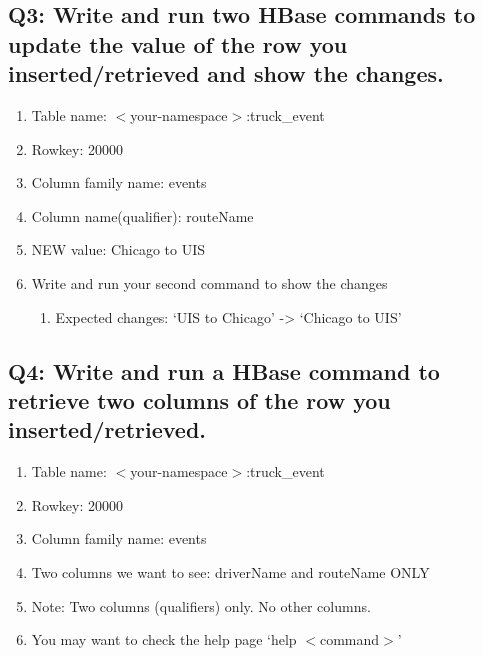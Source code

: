 \documentclass[]{article}
\begin{document}
\subsection*{Q3: Write and run two HBase commands to update the value of the row you inserted/retrieved and show the changes.} 
\begin{enumerate}[before=\itshape,font=\normalfont,label=\alph*.]
	\item Table name: $<$your-namespace$>$:truck\_event
	\item Rowkey: 20000
	\item Column family name: events
	\item Column name(qualifier): routeName
	\item NEW value: Chicago to UIS
	\item Write and run your second command to show the changes
	\begin{enumerate}[label=\roman*.]
		\item Expected changes: ‘UIS to Chicago’ -> ‘Chicago to UIS’
	\end{enumerate}
\end{enumerate}

\subsection*{Q4: Write and run a HBase command to retrieve two columns of the row you inserted/retrieved.} 
\begin{enumerate}[before=\itshape,font=\normalfont,label=\alph*.]
	\item Table name: $<$your-namespace$>$:truck\_event
	\item Rowkey: 20000
	\item Column family name: events
	\item Two columns we want to see: driverName and routeName ONLY
	\item Note: Two columns (qualifiers) only. No other columns.
	\item You may want to check the help page ‘help $<$command$>$’
\end{enumerate}
\end{document}
